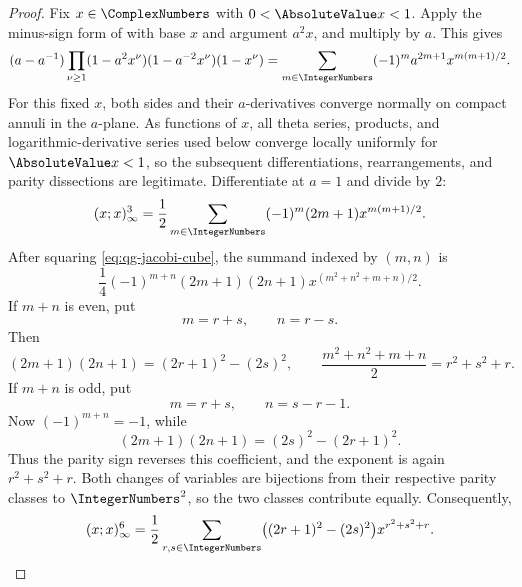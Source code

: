 \begin{proof}
Fix $x\in\ComplexNumbers$ with $0<\AbsoluteValue x<1$.  Apply the
minus-sign form of  with base $x$ and argument $a^2x$, and
multiply by $a$.  This gives
\begin{equation}
 (a-a^{-1})\prod_{\nu\ge1}
 (1-a^2x^\nu)(1-a^{-2}x^\nu)(1-x^\nu)
 =\sum_{m\in\IntegerNumbers}(-1)^ma^{2m+1}x^{m(m+1)/2}.
\label{eq:qg-four-square-start}
\end{equation}
For this fixed $x$, both sides and their $a$-derivatives converge normally on
compact annuli in the $a$-plane.  As functions of $x$, all theta series,
products, and logarithmic-derivative series used below converge locally
uniformly for $\AbsoluteValue x<1$, so the subsequent differentiations,
rearrangements, and parity dissections are legitimate.
Differentiate at $a=1$ and divide by $2$:
\begin{equation}
 (x;x)_\infty^3
 =\frac12\sum_{m\in\IntegerNumbers}(-1)^m(2m+1)x^{m(m+1)/2}.
\label{eq:qg-jacobi-cube}
\end{equation}
After squaring \eqref{eq:qg-jacobi-cube}, the summand indexed by $(m,n)$ is
\[
 \frac14(-1)^{m+n}(2m+1)(2n+1)
 x^{(m^2+n^2+m+n)/2}.
\]
If $m+n$ is even, put
\[
 m=r+s,\qquad n=r-s.
\]
Then
\[
 (2m+1)(2n+1)=(2r+1)^2-(2s)^2,
 \qquad
 \frac{m^2+n^2+m+n}{2}=r^2+s^2+r.
\]
If $m+n$ is odd, put
\[
 m=r+s,\qquad n=s-r-1.
\]
Now $(-1)^{m+n}=-1$, while
\[
 (2m+1)(2n+1)=(2s)^2-(2r+1)^2.
\]
Thus the parity sign reverses this coefficient, and the exponent is again
$r^2+s^2+r$.  Both changes of variables are bijections from their respective
parity classes to $\IntegerNumbers^2$, so the two classes contribute equally.
Consequently,
\begin{equation}
 (x;x)_\infty^6
 =\frac12\sum_{r,s\in\IntegerNumbers}
 \bigl((2r+1)^2-(2s)^2\bigr)x^{r^2+s^2+r}.
\label{eq:qg-four-square-coalesce}
\end{equation}


\end{proof}
